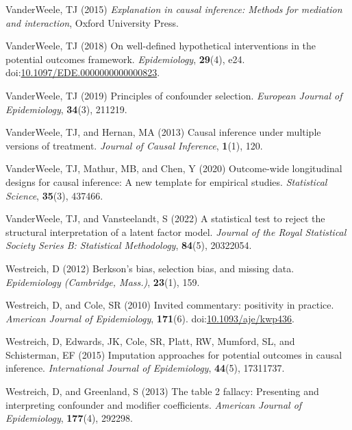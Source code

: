 \documentclass[
  singlecolumn]{article}
\newlength{\cslhangindent}
\newenvironment{CSLReferences}[2] %
 {\begin{list}{}{%
  \setlength{\itemindent}{0pt}
  \setlength{\leftmargin}{0pt}
  \setlength{\parsep}{0pt}
  \ifodd #1
   \setlength{\leftmargin}{\cslhangindent}
   \setlength{\itemindent}{-1\cslhangindent}
  \fi
  \setlength{\itemsep}{#2\baselineskip}}}
 {\end{list}}
\begin{document}
\begin{CSLReferences}{1}{0}
VanderWeele, TJ (2015) \emph{Explanation in causal inference: Methods
for mediation and interaction}, Oxford University Press.

VanderWeele, TJ (2018) On well-defined hypothetical interventions in the
potential outcomes framework. \emph{Epidemiology}, \textbf{29}(4), e24.
doi:\href{https://doi.org/10.1097/EDE.0000000000000823}{10.1097/EDE.0000000000000823}.

VanderWeele, TJ (2019) Principles of confounder selection.
\emph{European Journal of Epidemiology}, \textbf{34}(3), 211219.

VanderWeele, TJ, and Hernan, MA (2013) Causal inference under multiple
versions of treatment. \emph{Journal of Causal Inference},
\textbf{1}(1), 120.

VanderWeele, TJ, Mathur, MB, and Chen, Y (2020) Outcome-wide
longitudinal designs for causal inference: A new template for empirical
studies. \emph{Statistical Science}, \textbf{35}(3), 437466.

VanderWeele, TJ, and Vansteelandt, S (2022) A statistical test to reject
the structural interpretation of a latent factor model. \emph{Journal of
the Royal Statistical Society Series B: Statistical Methodology},
\textbf{84}(5), 20322054.

Westreich, D (2012) Berkson's bias, selection bias, and missing data.
\emph{Epidemiology (Cambridge, Mass.)}, \textbf{23}(1), 159.

Westreich, D, and Cole, SR (2010) Invited commentary: positivity in
practice. \emph{American Journal of Epidemiology}, \textbf{171}(6).
doi:\href{https://doi.org/10.1093/aje/kwp436}{10.1093/aje/kwp436}.

Westreich, D, Edwards, JK, Cole, SR, Platt, RW, Mumford, SL, and
Schisterman, EF (2015) Imputation approaches for potential outcomes in
causal inference. \emph{International Journal of Epidemiology},
\textbf{44}(5), 17311737.

Westreich, D, and Greenland, S (2013) The table 2 fallacy: Presenting
and interpreting confounder and modifier coefficients. \emph{American
Journal of Epidemiology}, \textbf{177}(4), 292298.

\end{CSLReferences}
\end{document}
